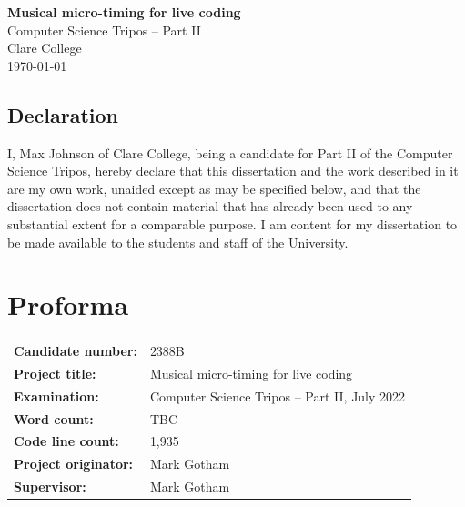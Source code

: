 \documentclass[12pt,twoside,openright]{report}
\begin{document}

\begin{titlepage}
    \pagestyle{empty}


    \vspace*{60mm}
    \begin{center}
    \Huge
    \textbf{Musical micro-timing for live coding} \\[5mm]
    Computer Science Tripos -- Part II \\[5mm]
    Clare College \\[5mm]
    \today
    \end{center}
\end{titlepage}


\pagestyle{plain}

\section*{Declaration}

I, Max Johnson of Clare College, being a candidate for Part II of the Computer Science Tripos, hereby declare that this dissertation and the work described in it are my own work, unaided except as may be specified below, and that the dissertation does not contain material that has already been used to any substantial extent for a comparable purpose. I am content for my dissertation to be made available to the students and staff of the University.

\bigskip
{}

\medskip
{}


\newpage
\chapter*{Proforma}

\begin{tabular}{ll}
\bf Candidate number:   & 2388B \\
\bf Project title:      & Musical micro-timing for live coding \\
\bf Examination:        & Computer Science Tripos -- Part II, July 2022  \\
\bf Word count:         & TBC \\
\bf Code line count:    & 1,935 \\
\bf Project originator: & Mark Gotham \\
\bf Supervisor:         & Mark Gotham
\end{tabular}
\end{document}
